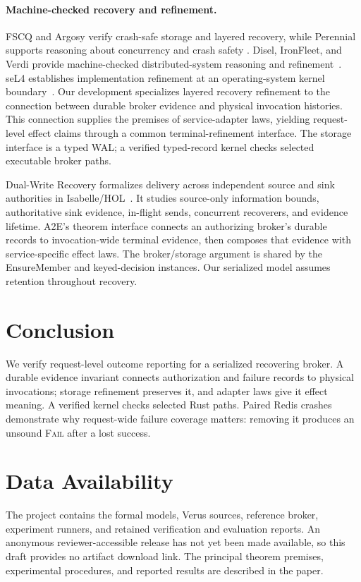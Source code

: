 \documentclass[acmsmall,screen,review,anonymous]{acmart}
\newcommand{\Fail}{\textsc{Fail}\xspace}
\begin{document}
\paragraph{Machine-checked recovery and refinement.}
FSCQ and Argosy verify crash-safe storage and layered recovery, while
Perennial supports reasoning about concurrency and crash safety
\cite{chen2015fscq,chajed2019argosy,chajed2019perennial}.
Disel, IronFleet, and Verdi provide machine-checked distributed-system
reasoning and refinement~\cite{sergey2018disel,hawblitzel2015ironfleet,
wilcox2015verdi}. seL4 establishes implementation refinement at an
operating-system kernel boundary~\cite{klein2009sel4}.
Our development specializes layered recovery refinement to the connection
between durable broker evidence and physical invocation histories.
This connection supplies the premises of service-adapter laws, yielding
request-level effect claims through a common terminal-refinement interface.
The storage interface is a typed WAL; a verified typed-record kernel
checks selected executable broker paths.

Dual-Write Recovery formalizes delivery across independent source and sink
authorities in Isabelle/HOL~\cite{andreakis2026dualwrite}. It studies
source-only information bounds, authoritative sink evidence, in-flight
sends, concurrent recoverers, and evidence lifetime. A2E's theorem interface
connects an authorizing broker's durable records to invocation-wide
terminal evidence, then composes that evidence with service-specific
effect laws. The broker/storage argument is shared by the EnsureMember
and keyed-decision instances. Our serialized model assumes retention
throughout recovery.

\section{Conclusion}
\label{sec:conclusion}

We verify request-level outcome reporting for a serialized recovering
broker. A durable evidence invariant connects authorization and failure
records to physical invocations; storage refinement preserves it, and
adapter laws give it effect meaning. A verified kernel checks selected
Rust paths. Paired Redis crashes demonstrate why request-wide failure
coverage matters: removing it produces an unsound \Fail after a lost success.

\section*{Data Availability}
The project contains the formal models, Verus sources, reference broker,
experiment runners, and retained verification and evaluation reports.
An anonymous reviewer-accessible release has not yet been made available,
so this draft provides no artifact download link. The principal theorem
premises, experimental procedures, and reported results are described in
the paper.



\end{document}

